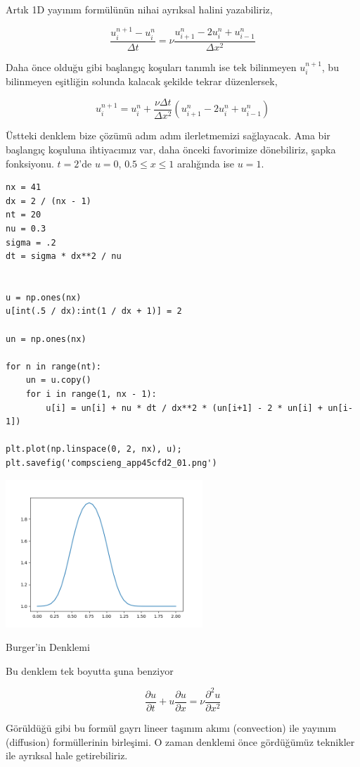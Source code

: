 \documentclass[12pt,fleqn]{article}\usepackage{../../common}
\begin{document}
Artık 1D yayınım formülünün nihai ayrıksal halini yazabiliriz,

$$
\frac{u_{i}^{n+1}-u_{i}^{n}}{\Delta t} =
\nu\frac{u_{i+1}^{n}-2u_{i}^{n}+u_{i-1}^{n}}{\Delta x^2}
$$

Daha önce olduğu gibi başlangıç koşuları tanımlı ise tek bilinmeyen
$u_{i}^{n+1}$, bu bilinmeyen eşitliğin solunda kalacak şekilde tekrar
düzenlersek,


$$
u_{i}^{n+1} =
u_{i}^{n}+\frac{\nu\Delta t}{\Delta x^2}(u_{i+1}^{n}-2u_{i}^{n}+u_{i-1}^{n})
$$

Üstteki denklem bize çözümü adım adım ilerletmemizi sağlayacak. Ama bir
başlangıç koşuluna ihtiyacımız var, daha önceki favorimize dönebiliriz, şapka
fonksiyonu. $t=2$'de $u=0$, $0.5\le x\le 1$ aralığında ise $u=1$. 

\begin{verbatim}
nx = 41
dx = 2 / (nx - 1)
nt = 20 
nu = 0.3 
sigma = .2 
dt = sigma * dx**2 / nu 


u = np.ones(nx)     
u[int(.5 / dx):int(1 / dx + 1)] = 2 

un = np.ones(nx)

for n in range(nt): 
    un = u.copy() 
    for i in range(1, nx - 1):
        u[i] = un[i] + nu * dt / dx**2 * (un[i+1] - 2 * un[i] + un[i-1])
        
plt.plot(np.linspace(0, 2, nx), u);
plt.savefig('compscieng_app45cfd2_01.png')
\end{verbatim}

\includegraphics[width=20em]{compscieng_app45cfd2_01.png}

Burger'in Denklemi

Bu denklem tek boyutta şuna benziyor

$$
\frac{\partial u}{\partial t} + u \frac{\partial u}{\partial x} =
\nu \frac{\partial ^2u}{\partial x^2}
$$

Görüldüğü gibi bu formül gayrı lineer taşınım akımı (convection) ile yayınım
(diffusion) formüllerinin birleşimi. O zaman denklemi önce gördüğümüz teknikler
ile ayrıksal hale getirebiliriz.
\end{document}
